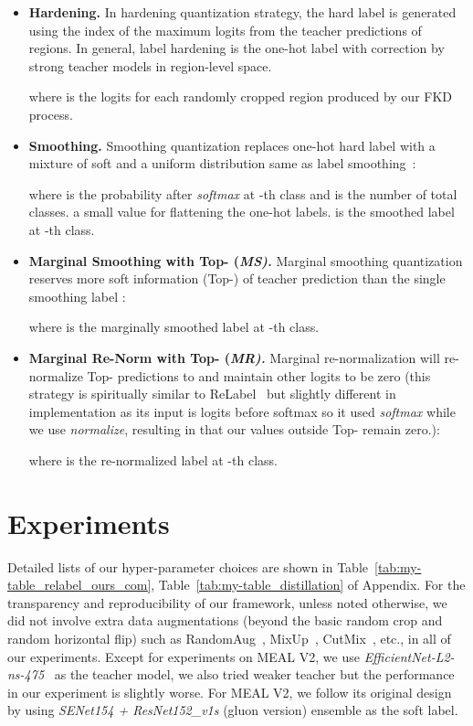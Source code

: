 \documentclass[10pt,twocolumn,letterpaper]{article}
\begin{document}
\begin{itemize}[leftmargin=0.1in]
	\addtolength{\itemsep}{-0.08in}
	\item \textbf{Hardening.} In hardening quantization strategy, the hard label  is generated using the index of the maximum logits from the teacher predictions of regions. In general, label hardening is the one-hot label with correction by strong teacher models in region-level space.
	\vspace{-0.05in}
	
	where  is the logits for each randomly cropped region produced by our FKD process.
	\item \textbf{Smoothing.}  Smoothing quantization replaces one-hot hard label  with a mixture of soft  and a uniform distribution same as label smoothing~\cite{szegedy2016rethinking}:
	\vspace{-0.05in}

where  is the probability after {\em softmax} at -th class and  is the number of total classes.  a small value for flattening the one-hot labels.  is the smoothed label at -th class.

	\item \textbf{Marginal Smoothing with Top- (\em MS).} Marginal smoothing quantization reserves more soft information (Top-) of teacher prediction than the single smoothing label :
    
where  is the marginally smoothed label at -th class. 

	\item \textbf{Marginal Re-Norm with Top- (\em MR).} Marginal re-normalization will re-normalize Top- predictions to  and maintain other logits to be zero (this strategy is spiritually similar to ReLabel~\cite{yun2021re} but slightly different in implementation as its input is logits before softmax so it used {\em softmax} while we use {\em normalize}, resulting in that our values outside  Top- remain zero.): 
	\vspace{-0.07in}
	
    
where  is the re-normalized label at -th class.
\end{itemize}


\section{Experiments}

 Detailed lists of our hyper-parameter choices are shown in Table~\ref{tab:my-table_relabel_ours_com}, Table~\ref{tab:my-table_distillation} of Appendix. For the transparency and reproducibility of our framework, unless noted otherwise, we did not involve extra data augmentations (beyond the basic random crop and random horizontal flip) such as RandomAug~\cite{cubuk2020randaugment}, MixUp~\cite{zhang2018mixup}, CutMix~\cite{yun2019cutmix}, etc., in all of our experiments. Except for experiments on MEAL V2, we use {\em EfficientNet-L2-ns-475}~\cite{tan2019efficientnet,xie2020self} as the teacher model, we also tried weaker teacher but the performance in our experiment is slightly worse. For MEAL V2, we follow its original design by using {\em SENet154 + ResNet152\_v1s} (gluon version) ensemble as the soft label.
\end{document}
